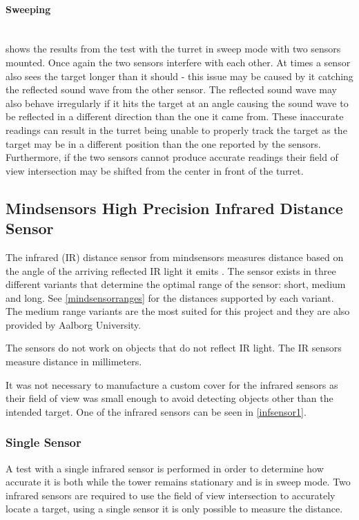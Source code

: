 \paragraph{Sweeping} ~\\
 shows the results from the test with the turret in sweep mode with two sensors mounted. Once again the two sensors interfere with each other. At times a sensor also sees the target longer than it should - this issue may be caused by it catching the reflected sound wave from the other sensor. The reflected sound wave may also behave irregularly if it hits the target at an angle causing the sound wave to be reflected in a different direction than the one it came from. These inaccurate readings can result in the turret being unable to properly track the target as the target may be in a different position than the one reported by the sensors. Furthermore, if the two sensors cannot produce accurate readings their field of view intersection may be shifted from the center in front of the turret.


\eal

\subsection{Mindsensors High Precision Infrared Distance Sensor}\label{ss:minddist}\label{\automlabel}
The infrared (IR) distance sensor from mindsensors measures distance based on the angle of the arriving reflected IR light it emits \cite{minddata}. The sensor exists in three different variants that determine the optimal range of the sensor: short, medium and long. See \cref{mindsensorranges} for the distances supported by each variant. The medium range variants are the most suited for this project and they are also provided by Aalborg University. 

The sensors do not work on objects that do not reflect IR light. The IR sensors measure distance in millimeters. 



It was not necessary to manufacture a custom cover for the infrared sensors as their field of view was small enough to avoid detecting objects other than the intended target. One of the infrared sensors can be seen in \cref{infsensor1}.


\subsubsection{Single Sensor}
A test with a single infrared sensor is performed in order to determine how accurate it is both while the tower remains stationary and is in sweep mode. Two infrared sensors are required to use the field of view intersection to accurately locate a target, using a single sensor it is only possible to measure the distance.


